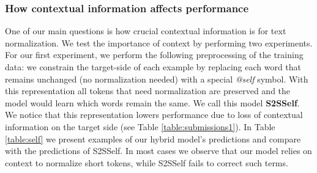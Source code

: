 \documentclass[letterpaper]{article} \usepackage{aaai19}  \usepackage{times}  \usepackage{helvet} \usepackage{courier}  \usepackage[hyphens]{url}  \usepackage{graphicx} \urlstyle{rm} \def\UrlFont{\rm}  \usepackage{graphicx}  \frenchspacing  \setlength{\pdfpagewidth}{8.5in}  \setlength{\pdfpageheight}{11in}
\begin{document}
\subsubsection{How contextual information affects performance}
\begin{table}[h]
  \centering
      \caption{Comparing HS2S with S2SSelf shows context is crucial for correct normalization, especially for short tokens.}
  \label{table:self}
\end{table}

One of our main questions is how crucial contextual information is for text normalization. We test the importance of context by performing two experiments. For our first experiment, we perform the following preprocessing of the training data: we constrain the target-side of each example by replacing each word that remains unchanged (no normalization needed) with a special \textit{@self} symbol. With this representation all tokens that need normalization are preserved and the model would learn which words remain the same. We call this model \textbf{S2SSelf}. We notice that this representation lowers performance due to loss of contextual information on the target side (see Table \ref{table:submissions1}). In Table \ref{table:self} we present examples of our hybrid model's predictions and compare with the predictions of S2SSelf. In most cases we observe that our model relies on context to normalize short tokens, while S2SSelf fails to correct such terms.
\end{document}

